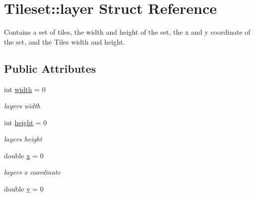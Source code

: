 \hypertarget{structTileset_1_1layer}{}\section{Tileset\+:\+:layer Struct Reference}
\label{structTileset_1_1layer}


Contains a set of tiles, the width and height of the set, the x and y coordinate of the set, and the Tiles width and height.  


\subsection*{Public Attributes}
\begin{DoxyCompactItemize}
\item 
int \hyperlink{structTileset_1_1layer_ad6b12441392f6fb36c810a36400f62d9}{width} = 0\hypertarget{structTileset_1_1layer_ad6b12441392f6fb36c810a36400f62d9}{}\label{structTileset_1_1layer_ad6b12441392f6fb36c810a36400f62d9}

\begin{DoxyCompactList}\small\item\em layers width \end{DoxyCompactList}\item 
int \hyperlink{structTileset_1_1layer_a252be76046fac668f5cb5e4e6c04ab74}{height} = 0\hypertarget{structTileset_1_1layer_a252be76046fac668f5cb5e4e6c04ab74}{}\label{structTileset_1_1layer_a252be76046fac668f5cb5e4e6c04ab74}

\begin{DoxyCompactList}\small\item\em layers height \end{DoxyCompactList}\item 
double \hyperlink{structTileset_1_1layer_aa781499dda8fdbbfb9eb6ffd49483217}{x} = 0\hypertarget{structTileset_1_1layer_aa781499dda8fdbbfb9eb6ffd49483217}{}\label{structTileset_1_1layer_aa781499dda8fdbbfb9eb6ffd49483217}

\begin{DoxyCompactList}\small\item\em layers x coordinate \end{DoxyCompactList}\item 
double \hyperlink{structTileset_1_1layer_a38eab8deed5bfa479d696b25dcaf6f1f}{y} = 0\hypertarget{structTileset_1_1layer_a38eab8deed5bfa479d696b25dcaf6f1f}{}\label{structTileset_1_1layer_a38eab8deed5bfa479d696b25dcaf6f1f}


\end{DoxyCompactItemize}

